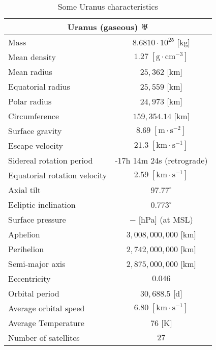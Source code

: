 	\begin{table}[H]
		\centering
		\begin{tabular}{|l|c|}
		\hline
		\multicolumn{2}{|c|}{\cellcolor[HTML]{9B9B9B}\textbf{Uranus (gaseous) $\uranus$}} \\ \hline
		Mass & $8.6810\cdot 10^{25}$ {[}kg{]} \\ \hline	
		Mean density & $1.27\;[\text{g}\cdot \text{cm}^{-3}]$ \\ \hline
		Mean radius & $25,362$ {[}km{]} \\ \hline
		Equatorial radius & $25,559 $ {[}km{]} \\ \hline
		Polar radius & $24,973$ {[}km{]} \\ \hline
		Circumference & $159,354.14$ {[}km{]} \\ \hline
		Surface gravity & $8.69\; [\text{m}\cdot \text{s}^{-2}]$ \\ \hline
		Escape velocity & $21.3\;[\text{km}\cdot\text{s}^{-1}]$ \\ \hline
		Sidereal rotation period & -17h 14m 24s (retrograde) \\ \hline
		Equatorial rotation velocity & $2.59\;[\text{km}\cdot\text{s}^{-1}]$ \\ \hline
		Axial tilt & $97.77^\circ$ \\ \hline
		Ecliptic inclination & $0.773^\circ$ \\ \hline
		Surface pressure & $-$ {[}hPa{]} (at MSL) \\ \hline
		Aphelion & $3,008,000,000$ {[}km{]} \\ \hline
		Perihelion & $2,742,000,000$ {[}km{]} \\ \hline
		Semi-major axis & $2,875,000,000$ {[}km{]} \\ \hline
		Eccentricity & $0.046$ \\ \hline
		Orbital period & $30,688.5$ {[}d{]} \\ \hline
		Average orbital speed & $6.80\;[\text{km}\cdot\text{s}^{-1}]$ \\ \hline
		Average Temperature & $76$ {[}K{]} \\ \hline
		Number of satellites & $27$ \\ \hline
		\end{tabular}
		\caption{Some Uranus characteristics}
	\end{table}
	
